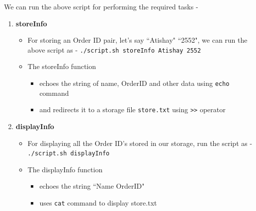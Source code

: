 \documentclass[12pt]{article}
\begin{document}
We can run the above script for performing the required tasks -
\begin{enumerate}
    \item \textbf{storeInfo}
    \begin{itemize}
        \item For storing an Order ID pair, let's say ``Atishay" ``2552", we can run the above script as - \texttt{./script.sh storeInfo Atishay 2552}
    \begin{figure}[H]
        \centering
            \begin{floatrow}
            \end{floatrow}
    \end{figure}
        \item The storeInfo function 
        \begin{itemize}
            \item echoes the string of name, OrderID and other data using \texttt{echo} command 
            \item and redirects it to a storage file \texttt{store.txt} using \texttt{>>} operator
        \end{itemize}
    \end{itemize}
    \item \textbf{displayInfo}
    \begin{itemize}
        \item For displaying all the Order ID's stored in our storage, run the script as - \texttt{./script.sh displayInfo}
        \item The displayInfo function
        \begin{itemize}
            \item echoes the string ``Name OrderID"
            \item uses \texttt{cat} command to display store.txt
        \end{itemize}
        \begin{figure}[H]
        \centering
            \begin{floatrow}

\end{floatrow}
\end{figure}
\end{itemize}
\end{enumerate}
\end{document}
